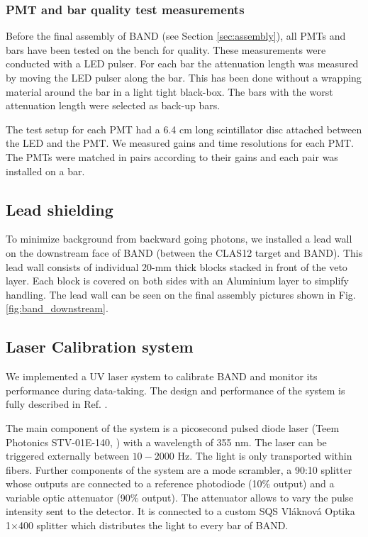 \documentclass[3p,final,twocolumn]{elsarticle}
\begin{document}
\subsubsection{PMT and bar quality test measurements}
Before the final assembly of BAND (see Section \ref{sec:assembly}), all PMTs and bars have been tested on the bench for quality. These measurements were conducted with a LED pulser.
For each bar the attenuation length was measured by moving the LED pulser along the bar. This has been done without a wrapping material around the bar in a light tight black-box. The bars with the worst attenuation length were selected as back-up bars.

The test setup for each PMT had a 6.4 \si{\centi\meter} long scintillator disc attached between the LED and the PMT. We measured gains and time resolutions for each PMT. The PMTs were matched in pairs according to their gains and each pair was installed on a bar.


\subsection{Lead shielding}
To minimize background from backward going photons, we installed a
lead wall on the downstream face of BAND (between the CLAS12 target
and BAND). This lead wall consists of individual 20-\si{\milli\meter}
thick blocks stacked in front of the veto layer. Each block is covered
on both sides with an Aluminium layer to simplify handling. The
lead wall can be seen on the final assembly pictures shown in
Fig. \ref{fig:band_downstream}.


\subsection{Laser Calibration system}
\label{sec:laserystem}
We implemented a UV laser system to calibrate BAND and monitor its
performance during data-taking. The design and performance of the
system is fully described in Ref. \cite{band-laser}. 

The main component of the system is a picosecond pulsed diode laser (Teem Photonics STV-01E-140, \cite{teem_laser}) with a wavelength of 355 \si{\nano\meter}. The laser can be triggered externally between $10-2000$ \si{\hertz}. The light is only transported within fibers. Further components of the system are a mode scrambler, a 90:10 splitter whose outputs are connected to a reference photodiode (10\% output) and a variable optic attenuator \cite{attenuator} (90\% output). The attenuator allows to vary the pulse intensity sent to the detector. It is connected to a custom SQS Vl\'aknov\'a Optika 1$\times$400 splitter which distributes the light to every bar of BAND. 
\end{document}
